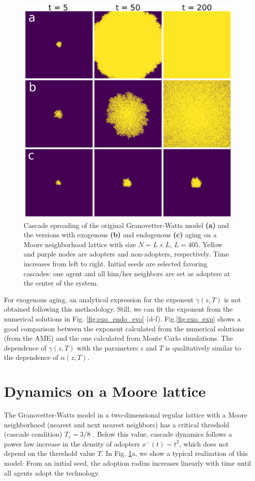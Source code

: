 \begin{figure}
    \centering \captionsetup{font=sf}
    \includegraphics[width=0.5\columnwidth]{Figs/Aging_Threshold/LATT_PLOT.png}
    \caption[Cascade spreading of the Granovetter-Watts model in a lattice]{\label{fig:evo_lat} Cascade spreading of the original Granovetter-Watts model \textbf{(a)} and the versions with exogenous \textbf{(b)} and endogenous \textbf{(c)} aging on a Moore neighborhood lattice with size $N = L \times L$, $L = 405$. Yellow and purple nodes are adopters and non-adopters, respectively. Time increases from left to right. Initial seeds are selected favoring cascades: one agent and all him/her neighbors are set as adopters at the center of the system.}
\end{figure}

For exogenous aging, an analytical expression for the exponent $\gamma(z,T)$ is not obtained following this methodology. Still, we can fit the exponent from the numerical solutions in Fig. \ref{fig:exo_endo_evo} (d-f). Fig.\ref{fig:exo_exp} shows a good comparison between the exponent calculated from the numerical solutions (from the AME) and the one calculated from  Monte Carlo simulations. The dependence of $\gamma(z,T)$ with the parameters $z$ and $T$ is qualitatively similar to the dependence of  $\alpha(z,T)$.

\section{\label{sec:Lattice} Dynamics on a Moore lattice}

The Granovetter-Watts model in a two-dimensional regular lattice with a Moore neighborhood (nearest and next nearest neighbors) has a critical threshold (cascade condition) $T_c = 3/8$ \cite{centola-2007}. Below this value, cascade dynamics follows a power law increase in the density of adopters $x^{-}(t) \sim t^2$, which does not depend on the threshold value $T$. In Fig. \ref{fig:evo_lat}a, we show a typical realization of this model: From an initial seed, the adoption radius increases linearly with time until all agents adopt the technology.

